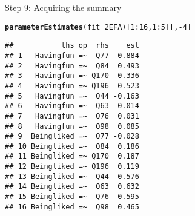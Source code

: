 \documentclass[10pt]{beamer}\usepackage[]{graphicx}\usepackage[]{xcolor}
\makeatletter
\newcommand{\hlnum}[1]{\textcolor[rgb]{0.686,0.059,0.569}{#1}}%
\newcommand{\hlopt}[1]{\textcolor[rgb]{0,0,0}{#1}}%
\newcommand{\hldef}[1]{\textcolor[rgb]{0.345,0.345,0.345}{#1}}%
\newcommand{\hlkwd}[1]{\textcolor[rgb]{0.737,0.353,0.396}{\textbf{#1}}}%
\newenvironment{kframe}{%
 \def\at@end@of@kframe{}%
 \ifinner\ifhmode%
  \def\at@end@of@kframe{\end{minipage}}%
  \begin{minipage}{\columnwidth}%
 \fi\fi%
 \def\FrameCommand##1{\hskip\@totalleftmargin \hskip-\fboxsep
 \colorbox{shadecolor}{##1}\hskip-\fboxsep
     \hskip-\linewidth \hskip-\@totalleftmargin \hskip\columnwidth}%
 \MakeFramed {\advance\hsize-\width
   \@totalleftmargin\z@ \linewidth\hsize
   \@setminipage}}%
 {\par\unskip\endMakeFramed%
 \at@end@of@kframe}
\newenvironment{knitrout}{}{} %
\makeatother
\begin{document}
\begin{frame}[fragile]{Step 9: Acquiring the summary}

\begin{knitrout}
\color{fgcolor}\begin{kframe}
\begin{alltt}
\hlkwd{parameterEstimates}\hldef{(fit_2EFA)[}\hlnum{1}\hlopt{:}\hlnum{16}\hldef{,}\hlnum{1}\hlopt{:}\hlnum{5}\hldef{][,}\hlopt{-}\hlnum{4}\hldef{]}
\end{alltt}
\begin{verbatim}
##           lhs op  rhs    est
## 1   Havingfun =~  Q77  0.884
## 2   Havingfun =~  Q84  0.493
## 3   Havingfun =~ Q170  0.336
## 4   Havingfun =~ Q196  0.523
## 5   Havingfun =~  Q44 -0.163
## 6   Havingfun =~  Q63  0.014
## 7   Havingfun =~  Q76  0.031
## 8   Havingfun =~  Q98  0.085
## 9  Beingliked =~  Q77 -0.028
## 10 Beingliked =~  Q84  0.186
## 11 Beingliked =~ Q170  0.187
## 12 Beingliked =~ Q196  0.119
## 13 Beingliked =~  Q44  0.576
## 14 Beingliked =~  Q63  0.632
## 15 Beingliked =~  Q76  0.595
## 16 Beingliked =~  Q98  0.465
\end{verbatim}
\end{kframe}
\end{knitrout}

\end{frame}
%
\end{document}
